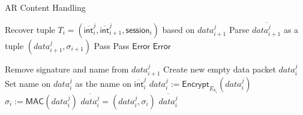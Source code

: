 \begin{algorithm}[ht!]
  \caption{AR Content Handling}
  \begin{algorithmic}[1]
\State Recover tuple $T_i = (\overline{\mathsf{int}}_{i}^{j}, \overline{\mathsf{int}}_{i+1}^{j}, \mathsf{session}_i)$ based on $data_{i+1}^j$
\State Parse $\overline{data_{i+1}^j}$ as a tuple $(data_{i+1}^j, \sigma_{i+1})$
  \State Pass
    \State Pass
  \Else
    \State \Return $\mathsf{Error}$ %
  \EndIf
\Else %
  \State \Return $\mathsf{Error}$
\EndIf

\State Remove signature and name from $data_{i+1}^j$    
\State Create new empty data packet $data_i^j$
\State Set name on $data_i^j$ as the name on $\overline{\mathsf{int}}_{i}^{j}$
\State $data_i^j := \mathsf{Encrypt}_{E_{k_i}}(data_i^j)$
\State $\sigma_i := \mathsf{MAC}(data_i^j)$
\State $\overline{data_{i}^j} = (data_i^j, \sigma_i)$
\State \Return $\overline{data_{i}^j}$

\end{algorithmic}
\label{alg:ar_content_handler}
\end{algorithm}

